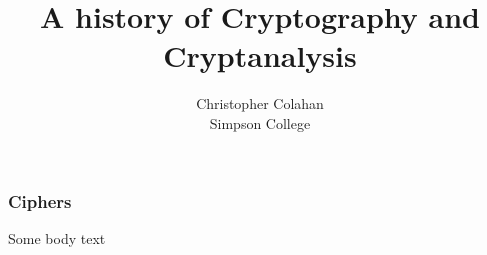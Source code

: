 \documentclass[12pt]{beamer}
\title{A history of Cryptography and Cryptanalysis}
\date{}
\author{Christopher Colahan\\ Simpson College}
\begin{document}
\frame{\titlepage}

\begin{frame}
	\frametitle{Ciphers}
	Some body text
\end{frame}
\end{document}
